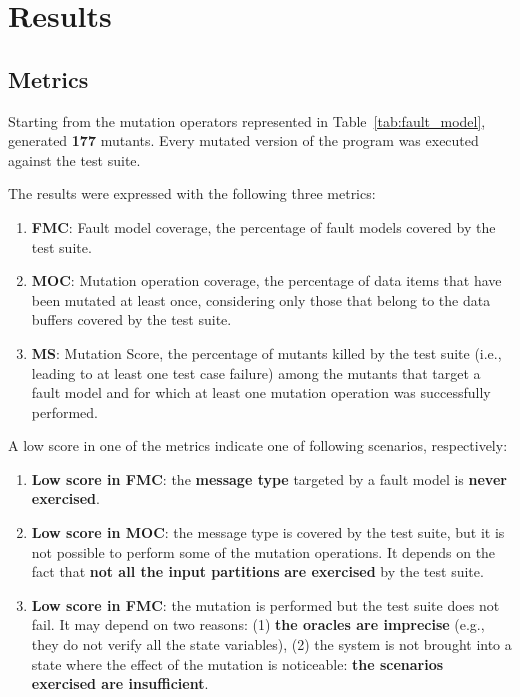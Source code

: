 
\chapter{Results}

\section{Metrics}

Starting from the mutation operators represented in Table~\ref{tab:fault_model}, \DAMA generated \textbf{177} mutants. Every mutated version of the program was executed against the \case test suite.

The results were expressed with the following three metrics:
\begin{enumerate}
\item \textbf{FMC}: Fault model coverage, the percentage of fault models covered by the test suite.
\item \textbf{MOC}: Mutation operation coverage, the percentage of data items that have been mutated at least once, considering only those that belong to the data buffers covered by the test suite.
\item \textbf{MS}: Mutation Score, the percentage of mutants killed by the test suite (i.e., leading to at least one test case failure) among the mutants that target a fault model and for which at least one mutation operation was successfully performed.
\end{enumerate}


A low score in one of the metrics indicate one of following scenarios, respectively:
\begin{enumerate}
\item \textbf{Low score in FMC}: the \textbf{message type} targeted by a fault model is \textbf{never exercised}.
\item \textbf{Low score in MOC}: the message type is covered by the test suite, but it is not possible to perform some of the mutation operations. It depends on the fact that \textbf{not all the input partitions} \textbf{are exercised} by the test suite.
\item \textbf{Low score in FMC}: the mutation is performed but the test suite does not fail. It may depend on two reasons: (1) \textbf{the oracles are imprecise} (e.g., they do not verify all the state variables), (2) the system is not brought into a state where the effect of the mutation is noticeable: \textbf{the scenarios exercised are insufficient}.
\end{enumerate}

